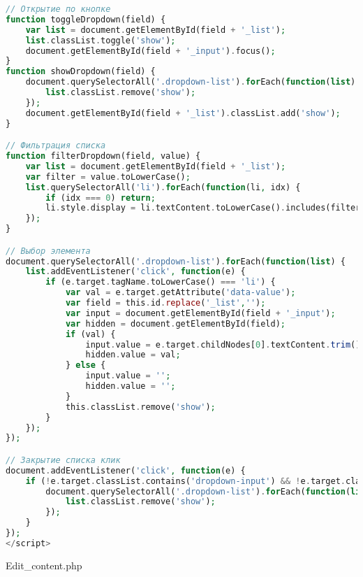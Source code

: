 \begin{lstlisting}[language=Php, frame=none]
// Открытие по кнопке
function toggleDropdown(field) {
	var list = document.getElementById(field + '_list');
	list.classList.toggle('show');
	document.getElementById(field + '_input').focus();
}
function showDropdown(field) {
	document.querySelectorAll('.dropdown-list').forEach(function(list) {
		list.classList.remove('show');
	});
	document.getElementById(field + '_list').classList.add('show');
}

// Фильтрация списка
function filterDropdown(field, value) {
	var list = document.getElementById(field + '_list');
	var filter = value.toLowerCase();
	list.querySelectorAll('li').forEach(function(li, idx) {
		if (idx === 0) return; 
		li.style.display = li.textContent.toLowerCase().includes(filter) ? '' : 'none';
	});
}

// Выбор элемента
document.querySelectorAll('.dropdown-list').forEach(function(list) {
	list.addEventListener('click', function(e) {
		if (e.target.tagName.toLowerCase() === 'li') {
			var val = e.target.getAttribute('data-value');
			var field = this.id.replace('_list','');
			var input = document.getElementById(field + '_input');
			var hidden = document.getElementById(field);
			if (val) {
				input.value = e.target.childNodes[0].textContent.trim();
				hidden.value = val;
			} else {
				input.value = '';
				hidden.value = '';
			}
			this.classList.remove('show');
		}
	});
});

// Закрытие списка клик
document.addEventListener('click', function(e) {
	if (!e.target.classList.contains('dropdown-input') && !e.target.classList.contains('dropdown-btn')) {
		document.querySelectorAll('.dropdown-list').forEach(function(list) {
			list.classList.remove('show');
		});
	}
});
</script>
\end{lstlisting}

Edit\_content.php

